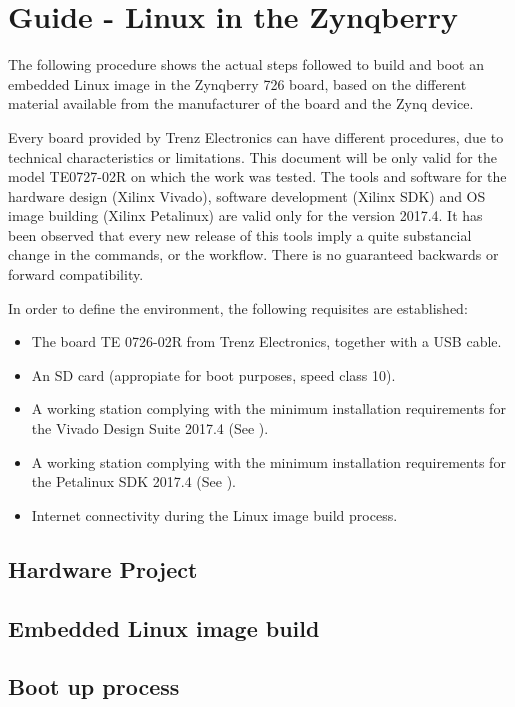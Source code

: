
\chapter{Guide - Linux in the Zynqberry} \label{appen1}

The following procedure shows the actual steps followed to build and boot an embedded Linux image in the Zynqberry 726 board, based on the different material available from the manufacturer of the board and the Zynq device.

Every board provided by Trenz Electronics can have different procedures, due to technical characteristics or limitations. This document will be only valid for the model TE0727-02R on which the work was tested. The tools and software for the hardware design (Xilinx Vivado), software development (Xilinx SDK) and OS image building (Xilinx Petalinux) are valid only for the version 2017.4. It has been observed that every new release of this tools imply a quite substancial change in the commands, or the workflow. There is no guaranteed backwards or forward compatibility.

In order to define the environment, the following requisites are established:

\begin{itemize}
	\item The board TE 0726-02R from Trenz Electronics, together with a USB cable.
	\item An SD card (appropiate for boot purposes, speed class 10).
	\item A working station complying with the minimum installation requirements for the Vivado Design Suite 2017.4 (See \cite{UG973}).
	\item A working station complying with the minimum installation requirements for the Petalinux SDK 2017.4 (See \cite{UG1144}).
	\item Internet connectivity during the Linux image build process.
\end{itemize}


\section{Hardware Project}

\section{Embedded Linux image build}

\section{Boot up process}

